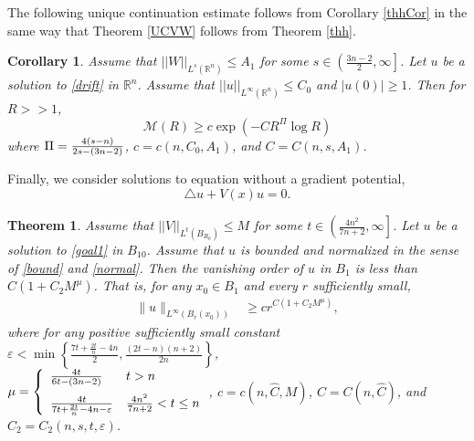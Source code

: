 \documentclass[11pt]{amsart}
\theoremstyle{plain}
\newtheorem{corollary}{Corollary}
\newtheorem{theorem}{Theorem}
\numberwithin{equation}{section}
\begin{document}
The following unique continuation estimate follows from Corollary \ref{thhCor} in the same way that Theorem \ref{UCVW} follows from Theorem \ref{thh}.

\begin{corollary}
Assume that ${\left\vert\left\vert {W}\right\vert\right\vert}_{L^s{\left( {{\ensuremath{\mathbb{R}}}^n} \right) }} \le A_1$ for some $s \in {\left( {\frac{3n-2}{2}, {\infty}} \right] }$.
Let $u$ be a solution to \eqref{drift} in ${\ensuremath{\mathbb{R}}}^n$.
Assume that ${\left\vert\left\vert {u}\right\vert\right\vert}_{L^{\infty}{\left( {{\ensuremath{\mathbb{R}}}^n} \right) }} \le C_0$ and ${\left\vert{u{\left( {0} \right) }}\right\vert} \ge 1$.
Then for $R >> 1$,
\begin{equation*}
\mathcal{M}{\left( {R} \right) } \ge c \exp{\left( {-C R^\Pi \log R} \right) }
\end{equation*}
where ${\displaystyle} \Pi = \frac{4{\left( {s-n} \right) }}{2s - {\left( {3n-2} \right) }}$, $c = c{\left( {n,
C_0, A_1} \right) }$, and $C = C{\left( {n, s, A_1} \right) }$. \label{UCW}
\end{corollary}

Finally, we consider solutions to equation without a gradient potential,
\begin{equation}
\triangle u+V(x) u=0 .
\label{goal1}
\end{equation}

\begin{theorem}
Assume that ${\left\vert\left\vert {V}\right\vert\right\vert}_{L^t{\left( {B_{R_0}} \right) }} \le M$ for some $t \in {\left( {
\frac{4 n^2}{7n+2}, {\infty}} \right] }$. Let $u$ be a solution to \eqref{goal1}
in $B_{10}$. Assume that $u$ is bounded and normalized in the sense
of \eqref{bound} and \eqref{normal}. Then the vanishing order of $u$
in $B_{1}$ is  less than $C{\left( {1 + C_2M^\mu} \right) }$. That is, for any
$x_0\in B_1$ and every $r$ sufficiently small,
\begin{align*}
 \|u\|_{L^{\infty}(B_{r}(x_0))}
 &\ge c r^{C{\left( {1 + C_2M^\mu} \right) }},
\end{align*}
where for any positive sufficiently small constant ${\varepsilon} <
\min{\left\{{\frac{7t+\frac{2t}n-4n}{2}, \frac{(2t-n)(n+2)}{2n} }\right\}}$, \\
${\displaystyle} \mu = \left\{\begin{array}{ll}
\frac{4t}{6t - {\left( {3n-2} \right) }} & t > n \medskip \\
\frac{4t} {7t+\frac{2t}n-4n-{\varepsilon}} & \frac{4n^2}{7n+2} < t \le n
\end{array}\right.$,
$c=c{\left( {n, \hat C, M} \right) }$, $C = C{\left( {n, \hat C} \right) }$, and $C_2 =
C_2{\left( {n, s, t, {\varepsilon}} \right) }$. \label{thhh}
\end{theorem}
\end{document}
